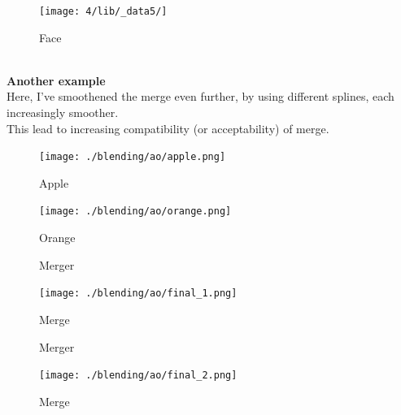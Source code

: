 \documentclass{article}
\begin{document}
    \begin{figure}[!htb]
    \minipage{\textwidth}
    \begin{center}
      \texttt{[image: 4/lib/\_data5/]}
      \caption{Face}
    \end{center}
    \endminipage \hfill
    \end{figure}
    \\[5pt]\textbf{Another example}\\
    Here, I've smoothened the merge even further, by using different splines, each increasingly smoother.\\
    This lead to increasing compatibility (or acceptability) of merge.\\[3pt]
    \begin{figure}[!htb]
    \begin{center}
      \texttt{[image: ./blending/ao/apple.png]}
      \caption{Apple}
    \end{center}
    \endminipage \hfill
    \begin{center}
      \texttt{[image: ./blending/ao/orange.png]}
      \caption{Orange}
     \end{center}
    \endminipage \hfill
    \end{figure}

    \pagebreak
    \begin{figure}[!htb]
      \caption{Merger}
    \endminipage \hfill
      \texttt{[image: ./blending/ao/final\_1.png]}
      \caption{Merge}
    \endminipage \hfill
    \end{figure}

    
    \begin{figure}[!htb]
      \caption{Merger}
    \endminipage \hfill
      \texttt{[image: ./blending/ao/final\_2.png]}
      \caption{Merge}
    \endminipage \hfill
    \end{figure}
\end{document}
